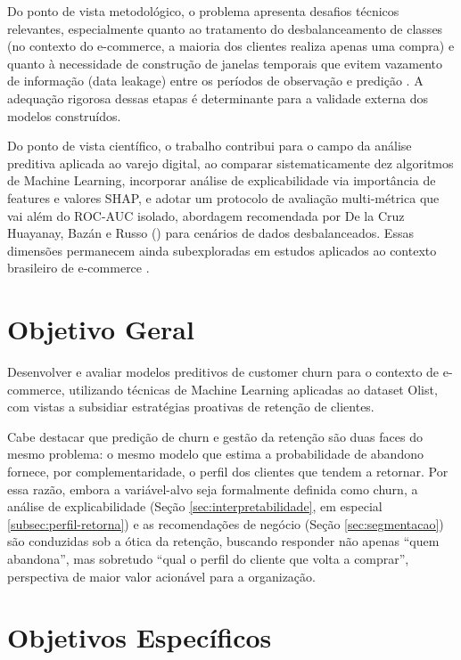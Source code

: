 Do ponto de vista metodológico, o problema apresenta desafios técnicos relevantes, especialmente quanto ao tratamento do desbalanceamento de classes (no contexto do e-commerce, a maioria dos clientes realiza apenas uma compra) e quanto à necessidade de construção de janelas temporais que evitem vazamento de informação (data leakage) entre os períodos de observação e predição \cite{kaufman2012}. A adequação rigorosa dessas etapas é determinante para a validade externa dos modelos construídos.

Do ponto de vista científico, o trabalho contribui para o campo da análise preditiva aplicada ao varejo digital, ao comparar sistematicamente dez algoritmos de Machine Learning, incorporar análise de explicabilidade via importância de features e valores SHAP, e adotar um protocolo de avaliação multi-métrica que vai além do ROC-AUC isolado, abordagem recomendada por De la Cruz Huayanay, Bazán e Russo (\citeyear{delacruz2025}) para cenários de dados desbalanceados. Essas dimensões permanecem ainda subexploradas em estudos aplicados ao contexto brasileiro de e-commerce \cite{matuszelanski2022}.

\FloatBarrier
\section{Objetivo Geral} \label{sec:objetivo-geral}

Desenvolver e avaliar modelos preditivos de customer churn para o contexto de e-commerce, utilizando técnicas de Machine Learning aplicadas ao dataset Olist, com vistas a subsidiar estratégias proativas de retenção de clientes.

Cabe destacar que predição de churn e gestão da retenção são duas faces do mesmo problema: o mesmo modelo que estima a probabilidade de abandono fornece, por complementaridade, o perfil dos clientes que tendem a retornar. Por essa razão, embora a variável-alvo seja formalmente definida como churn, a análise de explicabilidade (Seção \ref{sec:interpretabilidade}, em especial \ref{subsec:perfil-retorna}) e as recomendações de negócio (Seção \ref{sec:segmentacao}) são conduzidas sob a ótica da retenção, buscando responder não apenas ``quem abandona'', mas sobretudo ``qual o perfil do cliente que volta a comprar'', perspectiva de maior valor acionável para a organização.

\FloatBarrier
\section{Objetivos Específicos} \label{sec:objetivos-especificos}

